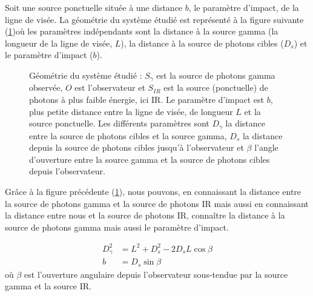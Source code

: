 \documentclass[a4paper,12pt,twoside]{article}
\begin{document}
Soit une source ponctuelle située à une distance $b$, le paramètre d'impact, de la ligne de visée. La géométrie du système étudié est représenté à la figure suivante (\ref{fig: source ponctuelle})où les paramètres indépendants sont la distance à la source gamma (la longueur de la ligne de visée, $L$), la distance à la source de photons cibles ($D_s$) et le paramètre d'impact ($b$).

\begin{figure}[H]
	\centering
    \caption{Géométrie du système étudié : $S_\gamma$ est la source de photons gamma observée, $O$ est l'observateur et $S_{IR}$ est la source (ponctuelle) de photons à plus faible énergie, ici IR. Le paramètre d'impact est $b$, plus petite distance entre la ligne de visée, de longueur $L$ et la source ponctuelle. Les différents paramètres sont $D_\gamma$ la distance entre la source de photons cibles et la source gamma, $D_s$ la distance depuis la source de photons cibles jusqu'à l'observateur et $\beta$ l'angle d'ouverture entre la source gamma et la source de photons cibles depuis l'observateur.}
        \label{fig: source ponctuelle}
\end{figure}

Grâce à la figure précédente (\ref{fig: source ponctuelle}), nous pouvons, en connaissant la distance entre la source de photons gamma et la source de photons IR mais aussi en connaissant la distance entre nous et la source de photons IR, connaître la distance à la source de photons gamma mais aussi le paramètre d'impact.

\begin{align*}
	D_\gamma^2 &= L^2 + D_s^2 - 2D_s L \cos\beta\\
    b &=D_s\sin\beta
\end{align*}
où $\beta$ est l'ouverture angulaire depuis l'observateur sous-tendue par la source gamma et la source IR.
\end{document}
